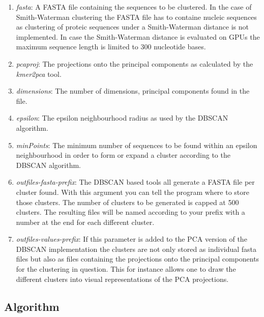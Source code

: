 \begin{enumerate}
  \item \emph{fasta}: A FASTA file containing the sequences to be
    clustered. In the case of Smith-Waterman clustering the FASTA file
    has to containe nucleic sequences as clustering of proteic
    sequences under a Smith-Waterman distance is not implemented. In
    case the Smith-Waterman distance is evaluated on GPUs the maximum
    sequence length is limited to 300 nucleotide bases.
  \item \emph{pcaproj}: The projections onto the principal components
    as calculated by the \emph{kmer2pca} tool. 
  \item \emph{dimensions}: The number of dimensions, principal
    components found in the file.
  \item \emph{epsilon}: The epsilon neighbourhood radius as used by the DBSCAN
    \cite{dbscan} algorithm.
  \item \emph{minPoints}: The minimum number of sequences to be found
    within an epsilon neighbourhood in order to form or expand a
    cluster according to the DBSCAN algorithm.
  \item \emph{outfiles-fasta-prefix}: The DBSCAN based tools all
    generate a FASTA file per cluster found. With this argument you
    can tell the program where to store those clusters. The number of
    clusters to be generated is capped at 500 clusters. The resulting
    files will be named according to your prefix with a number at the
    end for each different cluster.
  \item \emph{outfiles-values-prefix}: If this parameter is added to
    the PCA version of the DBSCAN implementation the clusters are not
    only stored as individual fasta files but also as files containing
    the projections onto the principal components for the clustering
    in question. This for instance allows one to draw the different
    clusters into visual representations of the PCA projections.
\end{enumerate}

\subsection{Algorithm} \label{sec-dbscan-algorithm}

